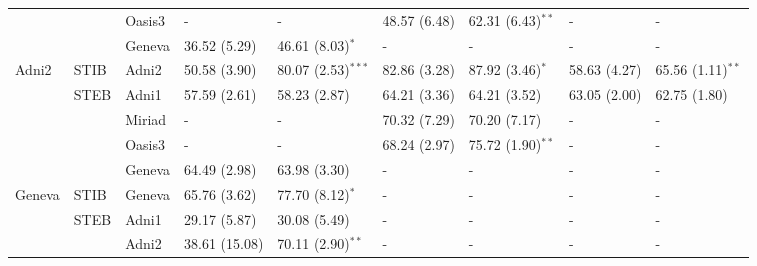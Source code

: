\begin{table*}
{\begin{tabular}{lllllllll}
       &                 & Oasis3         &              -       &             -          &   48.57 (6.48) &   62.31 (6.43)$^{**}$ &             - &             -         \\
	&                 & Geneva        &   36.52 (5.29)       &  46.61 (8.03)$^{*}$    &              - &              -        &             - &             -         \\
\toprule
Adni2  &         STIB    & Adni2          &   50.58 (3.90)       &  80.07 (2.53)$^{***}$  &   82.86 (3.28) &   87.92 (3.46)$^{*}$  &  58.63 (4.27) &  65.56 (1.11)$^{**}$  \\
\cmidrule(lr){2-9}
       &         STEB    & Adni1          &   57.59 (2.61)       &  58.23 (2.87)          &   64.21 (3.36) &   64.21 (3.52)        &  63.05 (2.00) &  62.75 (1.80)         \\
       &                 & Miriad         &              -       &             -          &   70.32 (7.29) &   70.20 (7.17)        &             - &             -         \\
       &                 & Oasis3         &              -       &             -          &   68.24 (2.97) &   75.72 (1.90)$^{**}$ &             - &             -         \\
       &                 & Geneva         &   64.49 (2.98)       &  63.98 (3.30)          &              - &              -        &             - &             -         \\
\toprule
Geneva &         STIB    & Geneva         &   65.76 (3.62)       &  77.70 (8.12)$^{*}$    &              - &              -        &             - &             -         \\
\cmidrule(lr){2-9}
       &         STEB    & Adni1          &   29.17 (5.87)       &  30.08 (5.49)          &              - &              -        &             - &             -         \\
       &                 & Adni2          &  38.61 (15.08)       &  70.11 (2.90)$^{**}$   &              - &              -        &             - &             -         \\

\end{tabular}}
\end{table*}

